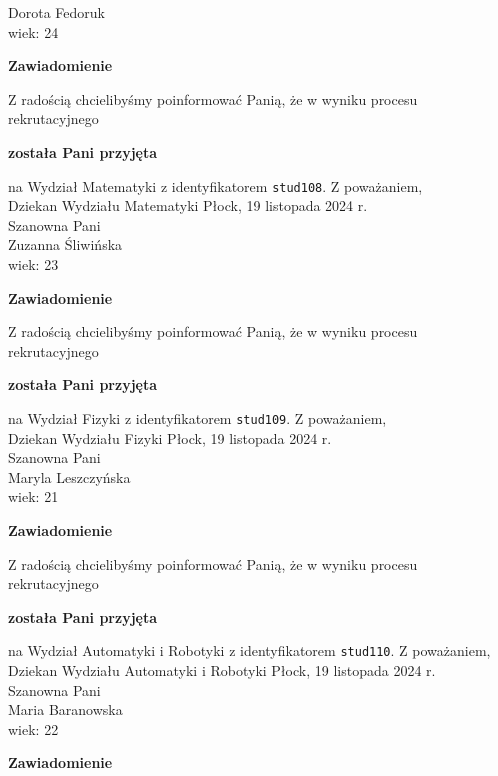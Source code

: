 \documentclass[12pt,a4paper]{article}
\begin{document}
Dorota Fedoruk \\
wiek: 24
\bigskip
\begin{center}
    {\Large\textbf{Zawiadomienie}}
\end{center}
\bigskip 
Z radością chcielibyśmy poinformować Panią, że w wyniku procesu rekrutacyjnego
\begin{center}
\textsf{\textbf{została Pani przyjęta}}
\end{center}
na Wydział Matematyki z identyfikatorem \verb|stud108|. 
\vspace{2cm}
\noindent
Z poważaniem, \\
Dziekan
Wydziału Matematyki
\newpage
\hfill Płock, 19 listopada 2024 r. \\
\noindent
Szanowna Pani \\
Zuzanna Śliwińska \\
wiek: 23
\bigskip
\begin{center}
    {\Large\textbf{Zawiadomienie}}
\end{center}
\bigskip 
Z radością chcielibyśmy poinformować Panią, że w wyniku procesu rekrutacyjnego
\begin{center}
\textsf{\textbf{została Pani przyjęta}}
\end{center}
na Wydział Fizyki z identyfikatorem \verb|stud109|. 
\vspace{2cm}
\noindent
Z poważaniem, \\
Dziekan
Wydziału Fizyki
\newpage
\hfill Płock, 19 listopada 2024 r. \\
\noindent
Szanowna Pani \\
Maryla Leszczyńska \\
wiek: 21
\bigskip
\begin{center}
    {\Large\textbf{Zawiadomienie}}
\end{center}
\bigskip 
Z radością chcielibyśmy poinformować Panią, że w wyniku procesu rekrutacyjnego
\begin{center}
\textsf{\textbf{została Pani przyjęta}}
\end{center}
na Wydział Automatyki i Robotyki z identyfikatorem \verb|stud110|. 
\vspace{2cm}
\noindent
Z poważaniem, \\
Dziekan
Wydziału Automatyki i Robotyki
\newpage
\hfill Płock, 19 listopada 2024 r. \\
\noindent
Szanowna Pani \\
Maria Baranowska \\
wiek: 22
\bigskip
\begin{center}
    {\Large\textbf{Zawiadomienie}}
\end{center}
\end{document}
